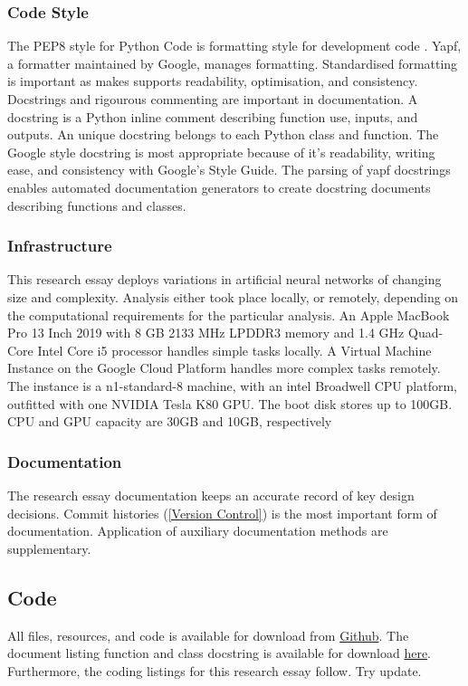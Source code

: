 \documentclass[12pt]{article}
\begin{document}
{\subsubsection{Code Style} \label{CS}
The PEP8 style for Python Code is formatting style for development code \cite{PEP8}. 
Yapf, a formatter maintained by Google, manages formatting.
Standardised formatting is important as makes supports readability, optimisation, and consistency.
Docstrings and rigourous commenting are important in documentation. 
A docstring is a Python inline comment describing function use, inputs, and outputs.
An unique docstring belongs to each Python class and function. 
The Google style docstring is most appropriate because of it's readability, writing ease, and consistency with Google's Style Guide.
The parsing of yapf docstrings enables automated documentation generators to create docstring documents describing functions and classes.

\subsubsection{Infrastructure}
This research essay deploys variations in artificial neural networks of changing size and complexity.
Analysis either took place locally, or remotely, depending on the computational requirements for the particular analysis.
An Apple MacBook Pro 13 Inch 2019 with 8 GB 2133 MHz LPDDR3 memory and 1.4 GHz Quad-Core Intel Core i5 processor handles simple tasks locally.
A Virtual Machine Instance on the Google Cloud Platform handles more complex tasks remotely.
The instance is a n1-standard-8 machine, with an intel Broadwell CPU platform, outfitted with one NVIDIA Tesla K80 GPU.
The boot disk stores up to 100GB. CPU and GPU capacity are 30GB and 10GB, respectively

\subsubsection{Documentation}
The research essay documentation keeps an accurate record of key design decisions.
Commit histories (\ref{Version Control}) is the most important form of documentation.
Application of auxiliary documentation methods are supplementary.
\subsection{Code} \label{code}
All files, resources, and code is available for download from \href{https://github.com/CMCD1996/finance-honours}{Github}.
The document listing function and class docstring is available for download \href{/Users/connor/Google Drive/Documents/Professional/Projects/Portfolio/downloads/wip.pdf}{here}.
Furthermore, the coding listings for this research essay follow. Try update.
% 
}
\end{document}
